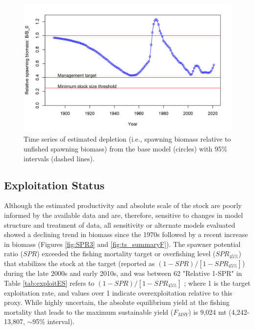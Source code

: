 \documentclass[11pt,
  english,
  a4paper,
]{article}
\begin{document}

\begin{figure}
\centering
\includegraphics[width=1\textwidth,height=0.7\textheight]{figs/ts9_Relative_spawning_biomass.png}
\caption{Time series of estimated depletion (i.e., spawning biomass relative to unfished spawning biomass) from the base model (circles) with 95\% intervals (dashed lines).}
\end{figure}

\tagmcend\tagstructend

\clearpage


\hypertarget{exploitation-status}{%
\subsection*{Exploitation Status}\label{exploitation-status}}

\leavevmode\tagmcend\tagstructend

Although the estimated productivity and absolute scale of the stock are poorly informed by the available data and are, therefore, sensitive to changes in model structure and treatment of data, all sensitivity or alternate models evaluated showed a declining trend in biomass since the 1970s followed by a recent increase in biomass (Figures \ref{fig:SPR3} and \ref{fig:ts_summaryF}). The spawner potential ratio ($SPR$)  exceeded the fishing mortality target or overfishing level ($SPR_{45\%}$) that stabilizes the stock at the target (reported as $(1-SPR)/[1-SPR_{45\%}]$) during the late 2000s and early 2010s, and was between 62%
"Relative 1-SPR" in Table \ref{tab:exploitES} refers to $(1-SPR)/[1-SPR_{45\%}]$ ; where 1 is the target exploitation rate, and values over 1 indicate overexploitation relative to this proxy. While highly uncertain, the
absolute equilibrium yield at the fishing mortality that leads to the maximum sustainable yield ($F_{MSY}$) is 9,024 mt (4,242-13,807, $\sim$95\% interval).
\end{document}
